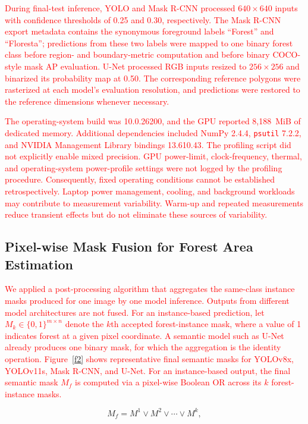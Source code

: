 \documentclass[journal,article,submit,pdftex,moreauthors]{Definitions/mdpi}
\begin{document}
\textcolor{red}{During final-test inference, YOLO and Mask R-CNN processed $640\times640$ inputs with confidence thresholds of 0.25 and 0.30, respectively. The Mask R-CNN export metadata contains the synonymous foreground labels ``Forest'' and ``Floresta''; predictions from these two labels were mapped to one binary forest class before region- and boundary-metric computation and before binary COCO-style mask AP evaluation. U-Net processed RGB inputs resized to $256\times256$ and binarized its probability map at 0.50. The corresponding reference polygons were rasterized at each model's evaluation resolution, and predictions were restored to the reference dimensions whenever necessary.}

\textcolor{red}{The operating-system build was 10.0.26200, and the GPU reported 8,188~MiB of dedicated memory. Additional dependencies included NumPy 2.4.4, \texttt{psutil} 7.2.2, and NVIDIA Management Library bindings 13.610.43. The profiling script did not explicitly enable mixed precision. GPU power-limit, clock-frequency, thermal, and operating-system power-profile settings were not logged by the profiling procedure. Consequently, fixed operating conditions cannot be established retrospectively. Laptop power management, cooling, and background workloads may contribute to measurement variability. Warm-up and repeated measurements reduce transient effects but do not eliminate these sources of variability.}

\subsection{Pixel-wise Mask Fusion for Forest Area Estimation}
\label{subsec:algorithm}

\textcolor{red}{We applied a post-processing algorithm that aggregates the same-class instance masks produced for one image by one model inference. Outputs from different model architectures are not fused. For an instance-based prediction, let $M_k \in \{0,1\}^{m \times n}$ denote the $k$th accepted forest-instance mask, where a value of 1 indicates forest at a given pixel coordinate. A semantic model such as U-Net already produces one binary mask, for which the aggregation is the identity operation. Figure~\ref{f2} shows representative final semantic masks for YOLOv8x, YOLOv11s, Mask R-CNN, and U-Net. For an instance-based output, the final semantic mask $M_f$ is computed via a pixel-wise Boolean OR across its $k$ forest-instance masks.}

\begin{equation} \label{eq1}
    M_f = M^1 \lor M^2 \lor \cdots \lor M^k,
\end{equation}
\end{document}
